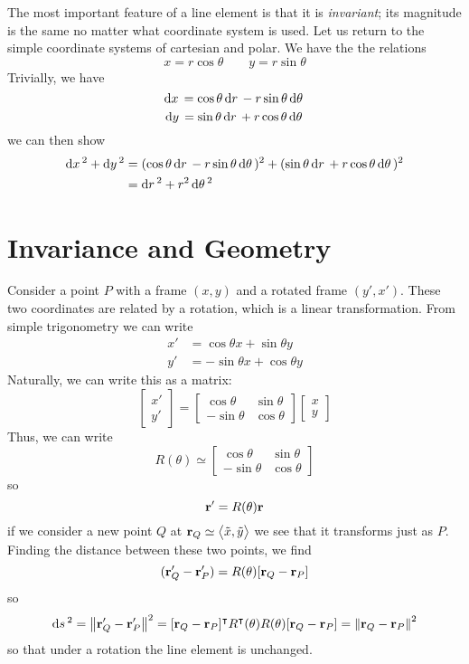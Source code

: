 The most important feature of a line element is that it is \emph{invariant}; its magnitude is the same no matter what coordinate system is used. Let us return to the simple coordinate systems of cartesian and polar. We have the the relations
\[x = r\cos\theta \qquad y = r\sin\theta\]
Trivially, we have 
\[\d{x} = \cos\theta\d r -r\sin\theta\d\theta\]
\[\d y = \sin\theta\d r +r\cos\theta\d\theta\]
we can then show
\begin{align*}
	\d x^2+\d y^2 &= (\cos\theta \d r - r\sin\theta\d\theta)^2 + (\sin\theta \d r + r\cos\theta\d\theta)^2\\
		      &=\d r^2 + r^2\d\theta^2
\end{align*}

\section{Invariance and Geometry}
Consider a point \(P\) with a frame \((x,y)\) and a rotated frame \((y', x')\). These two coordinates are related by a rotation, which is a linear transformation. From simple trigonometry we can write
\begin{align*}
	x' &= \cos \theta x + \sin\theta y\\
	y' &= -\sin\theta x + \cos\theta y
\end{align*}
Naturally, we can write this as a matrix:
\[ \begin{bmatrix}
	x'\\y'
\end{bmatrix} = \begin{bmatrix}
\cos\theta &\sin\theta \\
-\sin\theta & \cos\theta
\end{bmatrix} \begin{bmatrix}
x\\y
\end{bmatrix}\]
Thus, we can write
\begin{equation}
	R(\theta) \simeq \begin{bmatrix}
		\cos\theta & \sin\theta\\
		-\sin\theta & \cos\theta
	\end{bmatrix}
\end{equation}
so
\begin{equation}
	\mathbf{r}' = R(\theta)\mathbf{r}
\end{equation}
if we consider a new point \(Q\) at \(\mathbf{r}_Q\simeq \left\langle \begin{matrix}\tilde x,\tilde y\end{matrix} \right\rangle\) we see that it transforms just as \(P\). Finding the distance between these two points, we find
\[(\mathbf{r}_Q'-\mathbf{r}_P') = R(\theta)[\mathbf{r}_Q-\mathbf{r}_P]\]
so
\[\d{s}^2=\norm{\vb r_Q'-\vb r_P'}^2 = [\vb r_Q-\vb r_P]\T R\T(\theta)R(\theta)[\vb r_Q-\vb r_P] = \norm{\vb r_Q-\vb r_P}^2\]
so that under a rotation the line element is unchanged.

